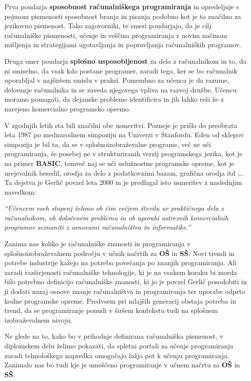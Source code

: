 Prva poudarja \textbf{sposobnost računalniškega programiranja} in
opredeljuje s pojmom pismenosti sposobnost branja in pisanja
podobno kot je to značilno za jezikovno pismenost. Tako zagovorniki,
te smeri poudarjajo, da je cilj računalniške pismenosti, učenje in
veščina programiranja z novim načinom mišljenja in strategijami
ugotavljanja in popravljanja računalniških programov.

Druga smer poudarja \textbf{splošno usposobljenost} za delo z
računalnikom in to, da ni smiselno, da vsak kdo postane programer,
zaradi tega, ker se bo računalnik uporabljal v najširšem smislu v
praksi. Pomembno za učenca je da razume, delovanje računalnika in se
zaveda njegovega vpliva na razvoj družbe. Učencu moramo pomagati, da
dejanske probleme identificira in jih lahko reši že z narejeno
komercialno programsko opremo.

V zgodnjih letih sta bili značilni obe usmeritvi. Pozneje je prišlo do
preobrata leta 1987 po mednarodnem simpoziju na Univerzi v
Stanfordu. Eden od sklepov simpozija je bil ta, da se v
splošnoizobraževalne programe, več ne uči programiranja, še posebej ne
v strukturiranih verzij programskega jezika, kot je na primer
\textbf{BASIC}, temveč naj se uči uslužnostne programske opreme, kot
je urejevalnik besedil, orodja za delo z podatkovnimi bazam, grafična
orodja itd \dots . Ta dejstva je Gerlič \cite{gerlic_2000} povzel leta
2000 in je predlagal isto usmeritev z naslednjim navedkom:

\emph{``Učencem vseh stopenj želimo ob
  čim večjem številu ur praktičnega dela z računalnikom, ob določenem
  problemu in ob uporabi ustreznih komercialnih programov seznaniti z
  osnovami računalništva in informatike.''}

Zanima nas koliko je računalniške znanosti in programiranja v
splošnoizobraževalnem področju v učnih načrtih za \textbf{OŠ} in
\textbf{SŠ}. Novi trendi in potrebe industrije kažejo na potrebo
povečanja po znanjih programiranja. Ali zaradi razširjenosti
računalniške tehnologije, ki je na vsakem koraku bi morda bilo
potrebno definicijo računalniške znanosti, ki jo je povzel Gerlič
posodobiti in ji dodati nazaj osnove znanje računalništva in
programiranja ter uporabe odprto kodne programske opreme. Predvsem pri
mlajših generacij obstaja potreba in trend, da se programiranje ponudi
v širšem kontekstu tudi na splošnem izobraževalnem nivoju.

Ne glede na to, kako bo v prihodnje definirana računalniška pismenost,
v diplomskem delu želimo pokazati, da spletni portali za učenje
programiranja zaradi tehnološkega napredka omogočajo lažjo pot k
učenju programiranja. Zanimalo nas bo tudi kje je umeščeno
programiranje v učnem načrtu za \textbf{OŠ} in \textbf{SŠ}.


